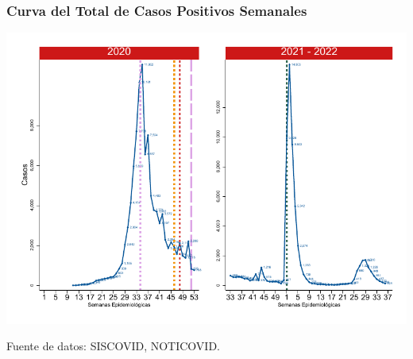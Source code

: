 \documentclass[xcolor=table]{beamer}
\begin{document}
	\begin{frame}[label=epi_cusco]
		\frametitle{Curva del Total de Casos Positivos Semanales}
		\vspace{-.5cm}
		\begin{center}
			\includegraphics[width=.9\linewidth]{../figuras/positivos_semanales_20_21_22.pdf}
		\end{center}
		{\tiny Fuente de datos: SISCOVID, NOTICOVID.} \\
	\end{frame}
	
\end{document}
